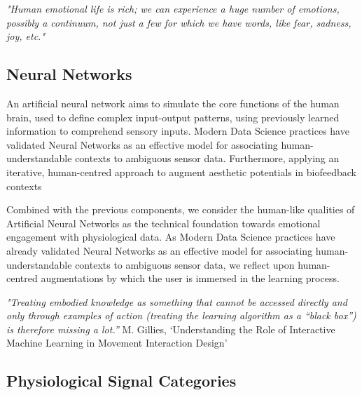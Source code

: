 \textit{"Human emotional life is rich; we can experience a huge number of emotions, possibly a continuum, not just a few for which we have words, like fear, sadness, joy, etc."}
 \cite{perlovsky_aesthetic_2014}


\subsection{Neural Networks}

An artificial neural network aims to simulate the core functions of the human brain, used to define complex input-output patterns, using previously learned information to comprehend sensory inputs. Modern Data Science practices have validated Neural Networks as an effective model for associating human-understandable contexts to ambiguous sensor data. Furthermore, applying an iterative, human-centred approach to augment aesthetic potentials in biofeedback contexts

Combined with the previous components, we consider the human-like qualities of Artificial Neural Networks as the technical foundation towards emotional engagement with physiological data. As Modern Data Science practices have already validated Neural Networks as an effective model for associating human-understandable contexts to ambiguous sensor data, we reflect upon human-centred augmentations by which the user is immersed in the learning process. 

\textit{"Treating embodied knowledge as something that cannot be accessed directly and only through examples of action (treating the learning algorithm as a “black box”) is therefore missing a lot.” }
M. Gillies, ‘Understanding the Role of Interactive Machine Learning in Movement Interaction Design’



\subsection{Physiological Signal Categories} 
\label{subsec:catagories}

